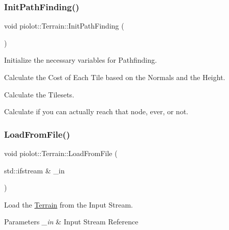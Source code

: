 \subsubsection{\texorpdfstring{Init\+Path\+Finding()}{InitPathFinding()}}
{\footnotesize\ttfamily void piolot\+::\+Terrain\+::\+Init\+Path\+Finding (\begin{DoxyParamCaption}{ }\end{DoxyParamCaption})}



Initialize the necessary variables for Pathfinding. 


\begin{DoxyEnumerate}
\item Calculate the Cost of Each Tile based on the Normals and the Height.
\item Calculate the Tilesets.
\item Calculate if you can actually reach that node, ever, or not. 
\end{DoxyEnumerate}\mbox{\label{classpiolot_1_1_terrain_ab975d5914a10346ddcbe29467f0862c2}} 
\subsubsection{\texorpdfstring{Load\+From\+File()}{LoadFromFile()}}
{\footnotesize\ttfamily void piolot\+::\+Terrain\+::\+Load\+From\+File (\begin{DoxyParamCaption}\item[{std\+::ifstream \&}]{\+\_\+in }\end{DoxyParamCaption})}



Load the \mbox{\hyperlink{classpiolot_1_1_terrain}{Terrain}} from the Input Stream. 


\begin{DoxyParams}{Parameters}
{\em \+\_\+in} & Input Stream Reference \\
\hline
\end{DoxyParams}
\mbox{\label{classpiolot_1_1_terrain_a211e06f07b056d9e412f9b7d5c61f28f}} 
